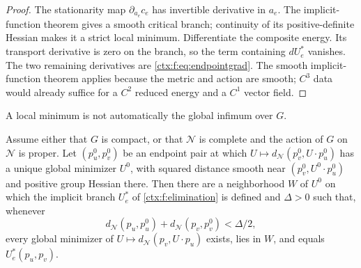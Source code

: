 \begin{proof}
The stationarity map $\partial_{a_e}c_e$ has invertible derivative in $a_e$. The implicit-function theorem gives a smooth critical branch; continuity of its positive-definite Hessian makes it a strict local minimum. Differentiate the composite energy. Its transport derivative is zero on the branch, so the term containing $dU_e^*$ vanishes. The two remaining derivatives are \cref{ctx:f:eq:endpointgrad}. The smooth implicit-function theorem applies because the metric and action are smooth; $C^3$ data would already suffice for a $C^2$ reduced energy and a $C^1$ vector field.
\end{proof}

A local minimum is not automatically the global infimum over $G$.

Assume either that $G$ is compact, or that $\mathcal N$ is complete and the action of $G$ on $\mathcal N$ is proper. Let $(p^0_u,p^0_v)$ be an endpoint pair at which $U\mapsto d_{\mathcal N}(p^0_v,U\cdot p^0_u)$ has a unique global minimizer $U^0$, with squared distance smooth near $(p^0_v,U^0\cdot p^0_u)$ and positive group Hessian there. Then there are a neighborhood $W$ of $U^0$ on which the implicit branch $U^*_e$ of \cref{ctx:f:elimination} is defined and $\Delta>0$ such that, whenever
\begin{equation}
 d_{\mathcal N}(p_u,p^0_u)+d_{\mathcal N}(p_v,p^0_v)<\Delta/2,
\end{equation}
every global minimizer of $U\mapsto d_{\mathcal N}(p_v,U\cdot p_u)$ exists, lies in $W$, and equals $U^*_e(p_u,p_v)$.

